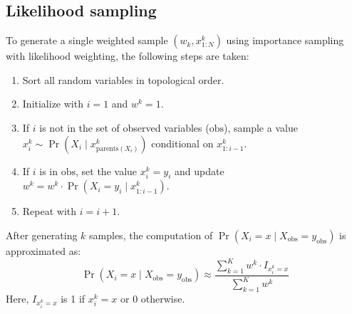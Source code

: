 \subsection{Likelihood sampling}
To generate a single weighted sample $(w_k,x_{1:N}^k)$ using importance sampling with likelihood weighting, the following steps are taken:
\begin{enumerate}
    \item Sort all random variables in topological order. 
    \item Initialize with $i=1$ and $w^k=1$.
    \item If $i$ is not in the set of observed variables ($\text{obs}$), sample a value $x_i^k \sim \Pr\left(X_i\mid x_{\text{parents}(X_i)}^k\right)$ conditional on $x^k_{1:i-1}$. 
    \item If $i$ is in $\text{obs}$, set the value $x_i^k =y_i$ and update $w^k=w^k\cdot\Pr\left( X_i=y_i\mid x^k_{1:i-1} \right)$.
    \item Repeat with $i=i+1$.
\end{enumerate}
After generating $k$ samples, the computation of $\Pr\left(X_i=x\mid X_{\text{obs}}=y_{\text{obs}}\right)$ is approximated as:
\[\Pr\left(X_i=x\mid X_{\text{obs}}=y_{\text{obs}}\right) \approx \dfrac{\sum_{k=1}^Kw^k\cdot I_{x_i^k=x}}{\sum_{k=1}^Kw^k}\]
Here, $I_{x_i^k=x}$ is 1 if $x_i^k=x$ or 0 otherwise. 

